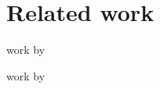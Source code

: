 \chapter{Related work}\label{ch:related-work}
work by \citet{blum2020recovering}

work by \citep{blum2020recovering}
